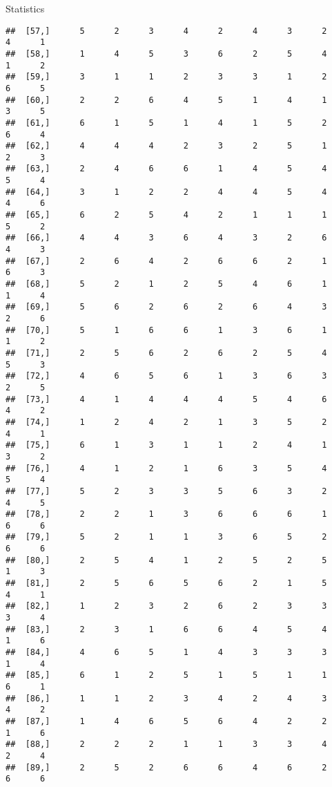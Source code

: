 \documentclass[
  ignorenonframetext,
]{beamer}
\begin{document}
\begin{frame}[fragile]{Statistics}
\begin{verbatim}
##  [57,]      5      2      3      4      2      4      3      2      4      1
##  [58,]      1      4      5      3      6      2      5      4      1      2
##  [59,]      3      1      1      2      3      3      1      2      6      5
##  [60,]      2      2      6      4      5      1      4      1      3      5
##  [61,]      6      1      5      1      4      1      5      2      6      4
##  [62,]      4      4      4      2      3      2      5      1      2      3
##  [63,]      2      4      6      6      1      4      5      4      5      4
##  [64,]      3      1      2      2      4      4      5      4      4      6
##  [65,]      6      2      5      4      2      1      1      1      5      2
##  [66,]      4      4      3      6      4      3      2      6      4      3
##  [67,]      2      6      4      2      6      6      2      1      6      3
##  [68,]      5      2      1      2      5      4      6      1      1      4
##  [69,]      5      6      2      6      2      6      4      3      2      6
##  [70,]      5      1      6      6      1      3      6      1      1      2
##  [71,]      2      5      6      2      6      2      5      4      5      3
##  [72,]      4      6      5      6      1      3      6      3      2      5
##  [73,]      4      1      4      4      4      5      4      6      4      2
##  [74,]      1      2      4      2      1      3      5      2      4      1
##  [75,]      6      1      3      1      1      2      4      1      3      2
##  [76,]      4      1      2      1      6      3      5      4      5      4
##  [77,]      5      2      3      3      5      6      3      2      4      5
##  [78,]      2      2      1      3      6      6      6      1      6      6
##  [79,]      5      2      1      1      3      6      5      2      6      6
##  [80,]      2      5      4      1      2      5      2      5      1      3
##  [81,]      2      5      6      5      6      2      1      5      4      1
##  [82,]      1      2      3      2      6      2      3      3      3      4
##  [83,]      2      3      1      6      6      4      5      4      1      6
##  [84,]      4      6      5      1      4      3      3      3      1      4
##  [85,]      6      1      2      5      1      5      1      1      6      1
##  [86,]      1      1      2      3      4      2      4      3      4      2
##  [87,]      1      4      6      5      6      4      2      2      1      6
##  [88,]      2      2      2      1      1      3      3      4      2      4
##  [89,]      2      5      2      6      6      4      6      2      6      6

\end{verbatim}
\end{frame}
\end{document}

